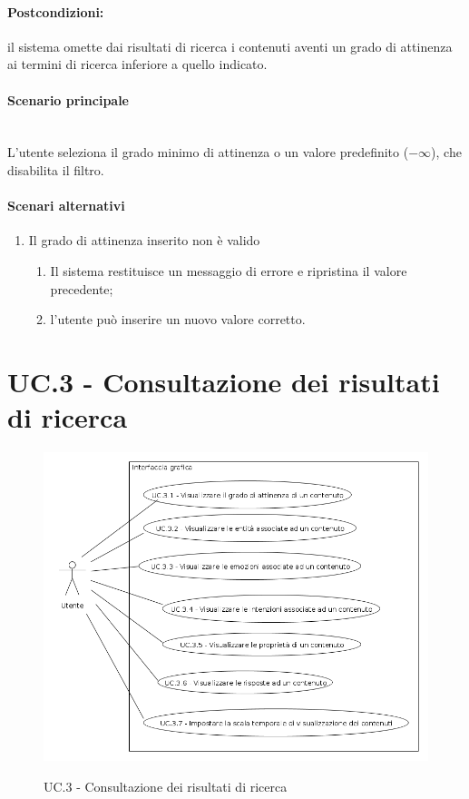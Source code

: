 \documentclass[10pt,a4paper,headinclude,footinclude,hidelinks]{scrreprt} %
\begin{document}
	\paragraph{Postcondizioni:} il sistema omette dai risultati di ricerca i contenuti aventi un grado di attinenza ai termini di ricerca inferiore a quello indicato.
	\paragraph{Scenario principale} \hfill \\
	L'utente seleziona il grado minimo di attinenza o un valore predefinito ($-\infty$), che disabilita il filtro.
	\paragraph{Scenari alternativi}
	\begin{enumerate}
	\item Il grado di attinenza inserito non è valido
		\begin{enumerate}
		\item Il sistema restituisce un messaggio di errore e ripristina il valore precedente;
		\item l'utente può inserire un nuovo valore corretto.
		\end{enumerate}
	\end{enumerate}

	\section{UC.3 - Consultazione dei risultati di ricerca}
	\label{ch:stage:ar:uc:3}

	\begin{figure}[ht]
		\begin{center}
	    	\includegraphics[width=12cm]{uc_3.png}
			\label{gfx:uc:3}
			\caption{UC.3 - Consultazione dei risultati di ricerca}
		\end{center}
	\end{figure}
\end{document}
